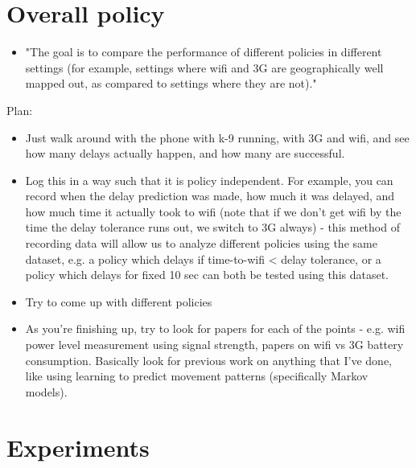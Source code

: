 \documentclass[12pt, fleqn]{article}
\begin{document}
 
\section{Overall policy}

\begin{itemize}
\item "The goal is to 
  compare the performance of different policies in different settings (for 
  example, settings where wifi and 3G are geographically well mapped out, as compared to 
  settings where they are not)."
\end{itemize}

Plan:
\begin{itemize}
  \item Just walk around with the phone with k-9 running, with 3G and wifi, and 
  see how many delays actually happen, and how many are successful.
  \item Log this in a way such that it is policy independent. For example, you 
  can record when the delay prediction was made, how much it was delayed, and 
  how much time it actually took to wifi (note that if we don't get wifi by the 
  time the delay tolerance runs out, we switch to 3G always) - this method of 
  recording data will allow us to analyze different policies using the same 
  dataset, e.g. a policy which delays if time-to-wifi < delay tolerance, or a 
  policy which delays for fixed 10 sec can both be tested using this dataset.
  \item Try to come up with different policies
  \item As you're finishing up, try to look for papers for each of the points - 
  e.g. wifi power level measurement using signal strength, papers on wifi vs 3G 
  battery consumption. Basically look for previous work on anything that I've 
  done, like using learning to predict movement patterns (specifically Markov 
  models).
\end{itemize}



\section{Experiments}

\end{document}
